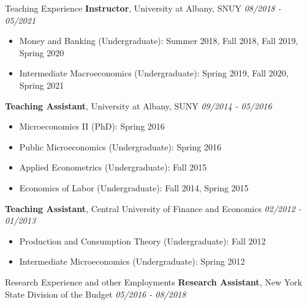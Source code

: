 \documentclass{resume_liang} %
\begin{document}
\begin{rSection}{Teaching Experience}
{\bf Instructor}{, University at Albany, SNUY} \hfill {\em 08/2018 - 05/2021}
 \begin{itemize}
     \item[] Money and Banking (Undergraduate): Summer 2018, Fall 2018, Fall 2019, Spring 2020
     \item[] Intermediate Macroeconomics (Undergraduate): Spring 2019, Fall 2020, Spring 2021
 \end{itemize} 
{\bf Teaching Assistant}{, University at Albany, SUNY} \hfill {\em 09/2014 - 05/2016}
   \begin{itemize}
     \item[] Microeconomics II (PhD): Spring 2016
     \item[] Public Microeconomics (Undergraduate): Spring 2016
     \item[] Applied Econometrics (Undergraduate): Fall 2015
     \item[] Economics of Labor (Undergraduate): Fall 2014, Spring 2015
   \end{itemize} 
{\bf Teaching Assistant}{, Central University of Finance and Economics} \hfill {\em 02/2012 - 01/2013}
\begin{itemize}
	\item[] Production and Consumption Theory (Undergraduate): Fall 2012
	\item[] Intermediate Microeconomics (Undergraduate): Spring 2012 
\end{itemize} 
\end{rSection}
\bigskip \bigskip





\begin{rSection}{Research Experience and other Employments}
	{\bf Research Assistant}{, New York State Division of the Budget} \hfill {\em 05/2016 - 08/2018}
\end{rSection}
\bigskip \bigskip
\end{document}
